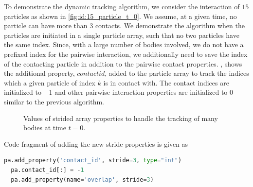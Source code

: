 To demonstrate the dynamic tracking algorithm, we consider the interaction of
$15$ particles as shown in \cref{fig:id:15_particle_t_0}. We assume, at a given
time, no particle can have more than $3$ contacts. We demonstrate the algorithm
when the particles are initiated in a single particle array, such that no two
particles have the same index. Since, with a large number of bodies involved, we
do not have a prefixed index for the pairwise interaction, we additionally need
to save the index of the contacting particle in addition to the pairwise contact
properties. , shows the additional
property, $contact id$, added to the particle array to track the indices which a
given particle of index $k$ is in contact with. The contact indices are
initialized to $-1$ and other pairwise interaction properties are initialized to
$0$ similar to the previous algorithm.
\begin{figure}[!htpb]
  \centering
  \footnotesize
  \caption{Values of strided array properties to handle the tracking of many bodies at time $t=0$.}
\label{fig:many_bodies_initialize_overlap_t_0}
\end{figure}

Code fragment of adding the new stride properties is given as
 \lstset{basicstyle=\footnotesize\ttfamily}
\begin{lstlisting}[label={contact:equations},frame=lines,language=Python,upquote=True]
  pa.add_property('contact_id', stride=3, type="int")
  pa.contact_id[:] = -1
  pa.add_property(name='overlap', stride=3)
\end{lstlisting}


